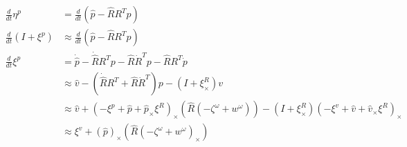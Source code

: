 \begin{equation}
    \begin{split}
        \frac{d}{dt} \eta^p &= \frac{d}{dt} (\hat{p} - \hat{R} R^T p) \\
        \frac{d}{dt} (I + \xi^p) &\approx \frac{d}{dt} (\hat{p} - \hat{R} R^T p) \\
        \frac{d}{dt} \xi^p &= \dot{\hat{p}} - \dot{\hat{R}}R^Tp - \hat{R} \dot{R}^T p - \hat{R} R^T \dot{p}\\
        &\approx \hat{v} - (\dot{\hat{R}}R^T + \hat{R} \dot{R}^T)p - (I +\xi^R_{\times})v\\
        &\approx \hat{v} + (-\xi^p + \hat{p} + \hat{p}_{\times} \xi^R)_{\times} (\hat{R} (-\zeta^{\omega} + w^{\omega}))  - (I +\xi^R_{\times}) (-\xi^v + \hat{v} + \hat{v}_{\times} \xi^R)_{\times}\\
        &\approx \xi^v + (\hat{p})_{\times} (\hat{R} (-\zeta^{\omega} + w^{\omega})_{\times})
    \end{split}
    \label{eq: p linearized RInEKF}
\end{equation}

